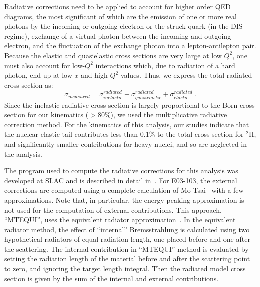 Radiative corrections need to be applied to account for higher order QED
diagrams, the most significant of which are the emission of one or more
real photons by the incoming or outgoing electron or the struck quark (in the
DIS regime), exchange of a virtual photon between the incoming and outgoing
electron, and the fluctuation of the exchange photon into a lepton-antilepton
pair.  Because the elastic and quasielastic cross sections are very large
at low $Q^2$, one must also account for low-$Q^2$ interactions which, due to
radiation of a hard photon, end up at low $x$ and high $Q^2$ values.
Thus, we express the total radiated cross section as:
%
\begin{equation}
\sigma_{measured}= \sigma^{radiated}_{inelastic}+
\sigma^{radiated}_{quasielastic}+ \sigma^{radiated}_{elastic} ~.
\end{equation}
%
Since the inelastic radiative cross section is largely proportional to the
Born cross section for our kinematics ($>$80\%), we used the multiplicative
radiative correction method. For the kinematics of this analysis, our studies
indicate that the nuclear elastic tail contributes less than 0.1\% to the
total cross section for $^2$H, and significantly smaller contributions for
heavy nuclei, and so are neglected in the analysis.



%


The program used to compute the radiative corrections for this analysis was
developed at SLAC and is described in detail in~\cite{dasu_thesis}. For
E03-103, the external corrections are computed using a complete calculation of
Mo-Tsai~\cite{motsai_rc} with a few approximations. Note that, in particular,
the energy-peaking approximation is not used for the computation of external
contributions. This approach, ``MTEQUI'', uses the equivalent radiator
approximation~\cite{dasu_thesis}. In the equivalent radiator method, the
effect of ``internal'' Bremsstrahlung is calculated using two hypothetical
radiators of equal radiation length, one placed before and one after the
scattering. The internal contribution in ``MTEQUI'' method is evaluated by
setting the radiation length of the material before and after the scattering
point to zero, and ignoring the target length integral. Then the radiated
model cross section is given by the sum of the internal and external
contributions.


